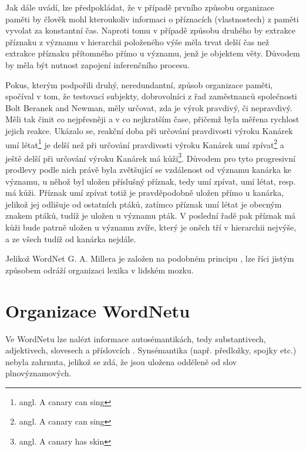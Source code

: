 \documentclass[a4paper, 11pt, oneside]{book}
\newcommand{\td}[2][]{
	{\todo[size=\footnotesize]{#2}}
}
\newcommand\ex{\textsf}
\begin{document}
			Jak \textcite{collins1969retrieval} dále uvádí, lze předpokládat, že v případě prvního způsobu organizace paměti by člověk mohl kteroukoliv informaci o příznacích (vlastnostech) z paměti vyvolat za konstantní čas. Naproti tomu v případě způsobu druhého by extrakce příznaku z významu v hierarchii položeného výše měla trvat delší čas než extrakce příznaku přítomného přímo u významu, jenž je objektem věty. Důvodem by měla být nutnost zapojení inferenčního procesu.

			Pokus, kterým podpořili \textcite{collins1969retrieval} druhý, neredundantní, způsob organizace paměti, spočíval v tom, že testovací subjekty, dobrovolníci z řad zaměstnanců společnosti Bolt Beranek and Newman, měly určovat, zda je výrok pravdivý, či nepravdivý. Měli tak činit co nejpřesněji a v co nejkratším čase, přičemž byla měřena rychlost jejich reakce. Ukázalo se, reakční doba při určování pravdivosti výroku \ex{Kanárek umí létat}\footnote{angl. \ex{A canary can sing}} je delší než při určování pravdivosti výroku \ex{Kanárek umí zpívat}\footnote{angl. \ex{A canary can sing}} a ještě delší při určování výroku \ex{Kanárek má kůži}\footnote{angl. \ex{A canary has skin}}. Důvodem pro tyto progresivní prodlevy podle nich právě byla zvětšující se vzdálenost od významu \ex{kanárka} ke významu, u něhož byl uložen příslušný příznak, tedy \ex{umí zpívat}, \ex{umí létat}, resp. \ex{má kůži}. Příznak \ex{umí zpívat} totiž je pravděpodobně uložen přímo u \ex{kanárka}, jelikož jej odlišuje od ostatních ptáků, zatímco příznak \ex{umí létat} je obecným znakem ptáků, tudíž je uložen u významu \ex{pták}. V poslední řadě pak příznak \ex{má kůži} bude patrně uložen u významu \ex{zvíře}, který je oněch tří v hierarchii nejvýše, a ze všech tudíž od kanárka nejdále.

			Jelikož WordNet G. A. Millera je založen na podobném principu\td{cit}, lze říci jistým způsobem odráží organizaci lexika v lidském mozku.

		

		\section{Organizace WordNetu}

			Ve WordNetu lze nalézt informace autosémantikách, tedy substantivech, adjektivech, slovesech a příslovcích \parencite{vossen1998introduction}. Synsémantika (např. předložky, spojky etc.) nebyla zahrnuta, jelikož se zdá, že jsou uložena odděleně od slov plnovýznamových. 

\end{document}
